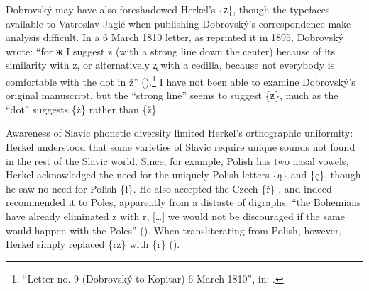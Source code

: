 Dobrovský may have also foreshadowed Herkel’s \{ƶ\}, though the typefaces available to Vatroslav Jagić when publishing Dobrovský’s correspondence make analysis difficult. In a 6 March 1810 letter, as \citeauthor{jagic_pisma_1895} reprinted it in 1895, Dobrovský wrote: “for ж I suggest z (with a strong line down the center) because of its similarity with z, or alternatively ʐ with a cedilla, because not everybody is comfortable with the dot in ž” (\citeyear[108]{jagic_pisma_1895}).\footnote{“Letter no. 9 (Dobrovský to Kopitar) 6 March 1810”, in: \citet[108]{jagic_pisma_1895}.} I have not been able to examine Dobrovský’s original manuscript, but the “strong line” seems to suggest \{ƶ\}, much as the “dot” suggests \{ż\} rather than \{ž\}.

Awareness of Slavic phonetic diversity limited Herkel’s orthographic uniformity: Herkel understood that some varieties of Slavic require unique sounds not found in the rest of the Slavic world. Since, for example, Polish has two nasal vowels, Herkel acknowledged the need for the uniquely Polish letters \{ą\} and \{ę\}, though he saw no need for Polish \{ł\}. He also accepted the Czech \{ř\} \citep[129]{herkel_elementa_1826}, and indeed recommended it to Poles, apparently from a distaste of digraphs: “the Bohemians have already eliminated z with r, […] we would not be discouraged if the same would happen with the Poles” (\citeyear[12]{herkel_elementa_1826}). When transliterating from Polish, however, Herkel simply replaced \{rz\} with \{r\} (\citeyear[135]{herkel_elementa_1826}).

